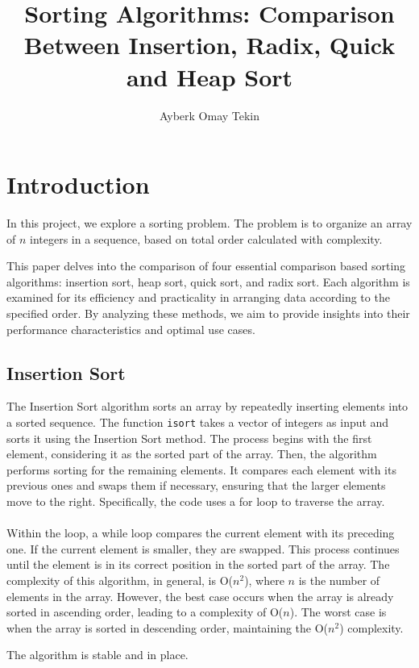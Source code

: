 \documentclass{article}
\title{Sorting Algorithms: Comparison Between Insertion, Radix, Quick and Heap Sort}
\author{Ayberk Omay Tekin}
\begin{document}
\maketitle

\section{Introduction}
In this project, we explore a sorting problem. 
The problem is to organize an array of $n$ integers in a sequence, based on total order calculated with complexity.

This paper delves into the comparison of four essential comparison based sorting algorithms: insertion sort, heap sort, quick sort, and radix sort. 
Each algorithm is examined for its efficiency and practicality in arranging data according to the specified order. 
By analyzing these methods, we aim to provide insights into their performance characteristics and optimal use cases.

\subsection{Insertion Sort}
The Insertion Sort algorithm sorts an array by repeatedly inserting elements into a sorted sequence. 
The function \texttt{isort} takes a vector of integers as input and sorts it using the Insertion Sort method.
The process begins with the first element, considering it as the sorted part of the array. 
Then, the algorithm performs sorting for the remaining elements. 
It compares each element with its previous ones and swaps them if necessary, ensuring that the larger elements move to the right.
Specifically, the code uses a for loop to traverse the array.
\paragraph{}
Within the loop, a while loop compares the current element with its preceding one. 
If the current element is smaller, they are swapped. 
This process continues until the element is in its correct position in the sorted part of the array.
The complexity of this algorithm, in general, is O($n^2$), where $n$ is the number of elements in the array. 
However, the best case occurs when the array is already sorted in ascending order, leading to a complexity of O($n$). 
The worst case is when the array is sorted in descending order, maintaining the O($n^2$) complexity.

The algorithm is stable and in place.
\end{document}
